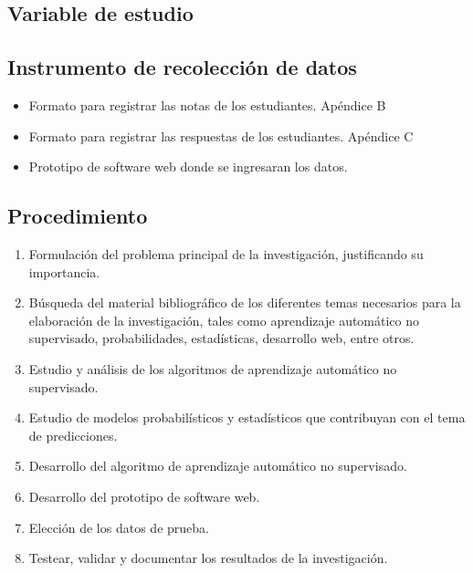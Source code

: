 \subsection{Variable de estudio}




\subsection{Instrumento de recolección de datos}

\begin{itemize}
	\item Formato para registrar las notas de los estudiantes. Apéndice B
	\item Formato para registrar las respuestas de los estudiantes. Apéndice C
	\item Prototipo de software web donde se ingresaran los datos.
\end{itemize}

\subsection{Procedimiento}

\begin{enumerate}
	\item Formulación del problema principal de la investigación, justificando su importancia.
	\item Búsqueda del material bibliográfico de los diferentes temas necesarios para la elaboración de la investigación, tales como aprendizaje automático no supervisado, probabilidades, estadísticas, desarrollo web, entre otros.
	\item Estudio y análisis de los algoritmos de aprendizaje automático no supervisado.
	\item Estudio de modelos probabilísticos y estadísticos que contribuyan con el tema de predicciones.
	\item Desarrollo del algoritmo de aprendizaje automático no supervisado.
	\item Desarrollo del prototipo de software web.
	\item Elección de los datos de prueba.
	\item Testear, validar y documentar los resultados de la investigación.
\end{enumerate}

